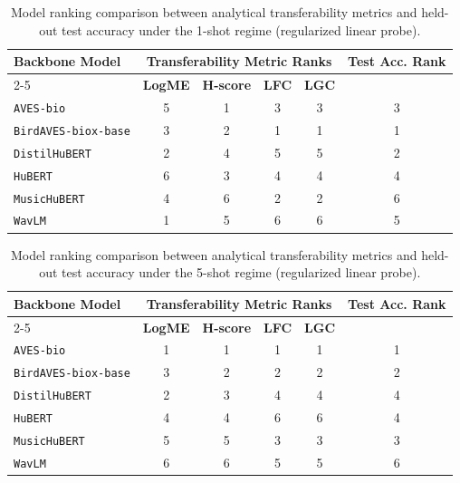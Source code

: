 \begin{table}[htbp]
\centering
\caption{Model ranking comparison between analytical transferability metrics and held-out test accuracy under the 1-shot regime (regularized linear probe).}
\label{tab:rank_comparison_1_shot}
\begin{tabular}{lccccc}
\hline
\textbf{Backbone Model} & \multicolumn{4}{c}{\textbf{Transferability Metric Ranks}} & \textbf{Test Acc. Rank} \\
\cline{2-5}
& \textbf{LogME} & \textbf{H-score} & \textbf{LFC} & \textbf{LGC} & \\
\hline
\texttt{AVES-bio} & 5 & 1 & 3 & 3 & 3 \\
\texttt{BirdAVES-biox-base} & 3 & 2 & 1 & 1 & 1 \\
\texttt{DistilHuBERT} & 2 & 4 & 5 & 5 & 2 \\
\texttt{HuBERT} & 6 & 3 & 4 & 4 & 4 \\
\texttt{MusicHuBERT} & 4 & 6 & 2 & 2 & 6 \\
\texttt{WavLM} & 1 & 5 & 6 & 6 & 5 \\
\hline
\end{tabular}
\end{table}


\begin{table}[htbp]
\centering
\caption{Model ranking comparison between analytical transferability metrics and held-out test accuracy under the 5-shot regime (regularized linear probe).}
\label{tab:rank_comparison_5_shot}
\begin{tabular}{lccccc}
\hline
\textbf{Backbone Model} & \multicolumn{4}{c}{\textbf{Transferability Metric Ranks}} & \textbf{Test Acc. Rank} \\
\cline{2-5}
& \textbf{LogME} & \textbf{H-score} & \textbf{LFC} & \textbf{LGC} & \\
\hline
\texttt{AVES-bio} & 1 & 1 & 1 & 1 & 1 \\
\texttt{BirdAVES-biox-base} & 3 & 2 & 2 & 2 & 2 \\
\texttt{DistilHuBERT} & 2 & 3 & 4 & 4 & 4 \\
\texttt{HuBERT} & 4 & 4 & 6 & 6 & 4 \\
\texttt{MusicHuBERT} & 5 & 5 & 3 & 3 & 3 \\
\texttt{WavLM} & 6 & 6 & 5 & 5 & 6 \\
\hline
\end{tabular}
\end{table}


